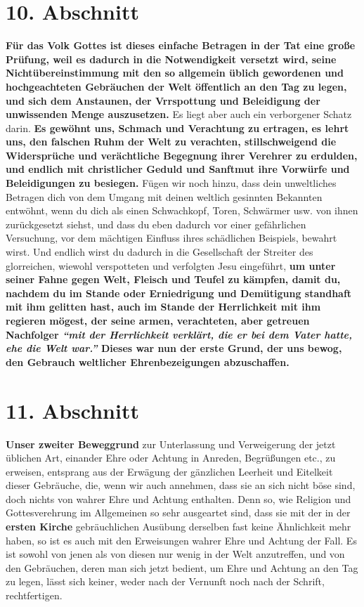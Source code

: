 \section{10. Abschnitt} \label{kap9_ab10}

\label{ref:09_10_spott} \textbf{Für das Volk Gottes ist dieses einfache
Betragen in der Tat
eine große
Prüfung,
weil es dadurch in die Notwendigkeit versetzt wird, seine Nichtübereinstimmung
mit den so allgemein üblich gewordenen und hochgeachteten Gebräuchen der Welt
öffentlich an den Tag zu legen, und sich dem Anstaunen, der Vrrspottung und
Beleidigung der unwissenden Menge auszusetzen.} Es liegt aber auch ein
verborgener Schatz darin. \textbf{Es gewöhnt uns, Schmach und Verachtung zu
ertragen,
es lehrt uns, den falschen Ruhm der Welt zu verachten,
stillschweigend die
Widersprüche und verächtliche Begegnung ihrer Verehrer zu erdulden, und endlich
mit christlicher Geduld und Sanftmut ihre Vorwürfe und Beleidigungen zu
besiegen.} Fügen wir noch hinzu, dass dein unweltliches Betragen dich von dem
Umgang mit deinen weltlich gesinnten Bekannten entwöhnt, wenn
du dich als einen
Schwachkopf, Toren, Schwärmer usw. von ihnen zurückgesetzt siehst, und dass
du eben dadurch vor einer gefährlichen Versuchung, vor dem mächtigen Einfluss
ihres schädlichen Beispiels, bewahrt wirst. Und endlich wirst du dadurch in
die Gesellschaft der Streiter des glorreichen, wiewohl verspotteten und
verfolgten Jesu eingeführt, \textbf{um unter seiner Fahne
gegen Welt, Fleisch und Teufel
zu kämpfen, damit du, nachdem du im Stande oder Erniedrigung und Demütigung
standhaft mit ihm gelitten hast, auch im Stande der Herrlichkeit mit ihm
regieren mögest, der seine armen, verachteten, aber getreuen Nachfolger
\textit{"`mit der Herrlichkeit verklärt, die er bei dem Vater hatte, ehe die
Welt
war."'}
Dieses war nun der erste Grund, der uns bewog, den
Gebrauch weltlicher Ehrenbezeigungen abzuschaffen.}

\section{11. Abschnitt} \label{kap9_ab11}

\textbf{Unser zweiter Beweggrund} zur Unterlassung und Verweigerung der jetzt
üblichen
Art, einander Ehre oder Achtung in Anreden, Begrüßungen etc., zu erweisen,
entsprang aus der Erwägung der gänzlichen Leerheit und Eitelkeit dieser
Gebräuche, die, wenn wir auch annehmen, dass sie an sich nicht böse sind, doch
nichts von wahrer Ehre und Achtung enthalten. Denn so, wie Religion und
Gottesverehrung im Allgemeinen so sehr ausgeartet sind, dass sie mit der in der
\textbf{ersten Kirche} gebräuchlichen Ausübung derselben
fast keine Ähnlichkeit mehr
haben, so ist es auch mit den Erweisungen wahrer Ehre und Achtung der Fall. Es
ist sowohl von jenen als von diesen nur wenig in der Welt anzutreffen, und von
den Gebräuchen, deren man sich jetzt bedient, um Ehre und Achtung an den Tag zu
legen, lässt sich keiner, weder nach der Vernunft noch nach der Schrift,
rechtfertigen.

